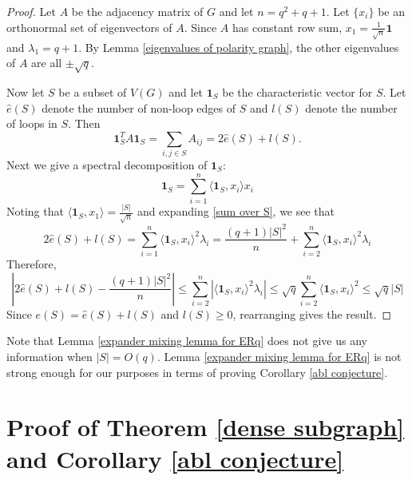 \documentclass[12pt]{article}
\begin{document}
\begin{proof}
    Let $A$ be the adjacency matrix of $G$ and let $n=q^2+q+1$. Let $\{x_i\}$ be an orthonormal set of eigenvectors of $A$. Since $A$ has constant row sum, $x_1 = \frac{1}{\sqrt{n}} \mathbf{1}$ and $\lambda_1 = q+1$. By Lemma \ref{eigenvalues of polarity graph}, the other eigenvalues of $A$ are all $\pm \sqrt{q}$.
    \medskip

    Now let $S$ be a subset of $V(G)$ and let $\mathbf{1}_S$ be the characteristic vector for $S$. Let $\hat{e}(S)$ denote the number of non-loop edges of $S$ and $l(S)$ denote the number of loops in $S$. Then
    \begin{equation}\label{sum over S}
        \mathbf{1}_S^T A \mathbf{1}_S = \sum_{i,j\in S} A_{ij} = 2\hat{e}(S) + l(S).
    \end{equation}
    Next we give a spectral decomposition of $\mathbf{1}_S$:
    $$\mathbf{1}_S = \sum_{i=1}^n \langle \mathbf{1}_S,x_i\rangle x_i $$
    Noting that $\langle \mathbf{1}_S, x_1\rangle = \frac{|S|}{\sqrt{n}}$ and expanding \eqref{sum over S}, we see that
    $$ 2\hat{e}(S) + l(S) = \sum_{i=1}^n \langle \mathbf{1}_S, x_i\rangle^2 \lambda_i = \frac{(q+1)|S|^2}{n} + \sum_{i=2}^n \langle \mathbf{1}_S, x_i\rangle^2 \lambda_i $$
    Therefore,
    $$ \left|2 \hat{e}(S) + l(S) - \frac{(q+1)|S|^2}{n} \right| \leq \sum_{i=2}^n \left|\langle \mathbf{1}_S, x_i\rangle^2 \lambda_i \right| \leq \sqrt{q} \sum_{i=2}^n \langle \mathbf{1}_S, x_i\rangle^2 \leq \sqrt{q} |S| $$
    Since $e(S) = \hat{e}(S) + l(S)$ and $l(S)\geq 0$, rearranging gives the result.
\end{proof}

Note that Lemma \ref{expander mixing lemma for ERq} does not give us any information when $|S| = O( q)$.  Lemma \ref{expander mixing lemma for ERq} is not strong enough for our purposes in terms of proving Corollary \ref{abl conjecture}.

\section{Proof of Theorem \ref{dense subgraph} and Corollary \ref{abl conjecture}}\label{proofs}
\end{document}
